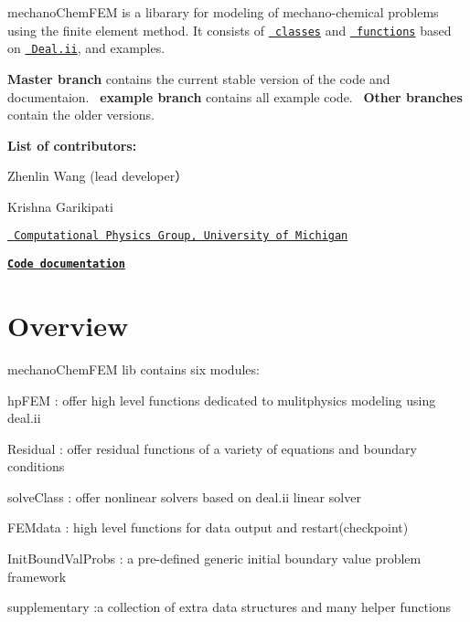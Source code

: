 mechano\+Chem\+F\+EM is a libarary for modeling of mechano-\/chemical problems using the finite element method. It consists of \href{https://htmlpreview.github.io/?https://raw.githubusercontent.com/mechanoChem/mechanoChemFEM/master/doxygen/html/annotated.html}{\texttt{ classes}} and \href{https://htmlpreview.github.io/?https://raw.githubusercontent.com/mechanoChem/mechanoChemFEM/master/doxygen/html/modules.html}{\texttt{ functions}} based on \href{https://www.dealii.org/}{\texttt{ Deal.\+ii}}, and examples.

{\bfseries{Master branch}} contains the current stable version of the code and documentaion.~\newline
 {\bfseries{example branch}} contains all example code.~\newline
 {\bfseries{Other branches}} contain the older versions.

{\bfseries{List of contributors\+:}}~\newline


Zhenlin Wang (lead developer）~\newline


Krishna Garikipati~\newline


\href{http://umich.edu/~compphys/index.html}{\texttt{ Computational Physics Group, University of Michigan}}

\href{https://htmlpreview.github.io/?https://raw.githubusercontent.com/mechanoChem/mechanoChemFEM/master/doxygen/html/index.html}{\texttt{ {\bfseries{Code documentation}}}}

\section*{{\bfseries{Overview}}~\newline
 }

mechano\+Chem\+F\+EM lib contains six modules\+:

\begin{DoxyVerb}hpFEM : offer high level functions dedicated to mulitphysics modeling using deal.ii

Residual : offer residual functions of a variety of equations and boundary conditions

solveClass : offer nonlinear solvers based on deal.ii linear solver

FEMdata : high level functions for data output and restart(checkpoint)

InitBoundValProbs :  a pre-defined generic initial boundary value problem framework

supplementary :a collection of extra data structures and many helper functions
\end{DoxyVerb}


